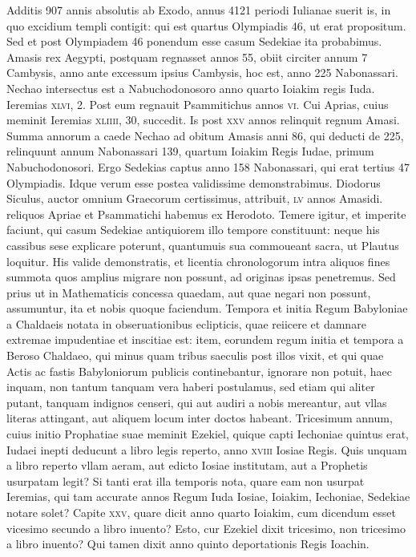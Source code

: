 Additis 907 annis absolutis ab Exodo,
annus 4121 periodi Iulianae suerit is, in quo excidium templi contigit:
qui est quartus Olympiadis 46, ut erat propositum.
Sed et post
Olympiadem 46 ponendum esse casum Sedekiae ita probabimus.
Amasis rex Aegypti, postquam regnasset annos 55, obiit circiter annum
7 Cambysis, anno ante excessum ipsius Cambysis, hoc est, anno
225 Nabonassari.
Nechao intersectus est a Nabuchodonosoro anno
quarto Ioiakim regis Iuda.
Ieremias \textsc{xlvi}, 2.
Post eum regnauit
Psammitichus annos \textsc{vi}.
Cui Aprias, cuius meminit Ieremias
\textsc{xliiii}, 30, succedit.
Is post \textsc{xxv} annos relinquit regnum Amasi.
Summa annorum a caede Nechao ad obitum Amasis anni 86, qui
deducti de 225, relinquunt annum Nabonassari 139, quartum Ioiakim
Regis Iudae, primum Nabuchodonosori.
Ergo Sedekias captus
anno 158 Nabonassari, qui erat tertius 47 Olympiadis.
Idque verum
esse postea validissime demonstrabimus.
Diodorus Siculus,
auctor omnium Graecorum certissimus, attribuit, \textsc{lv} annos Amasidi.
reliquos Apriae et Psammatichi habemus ex Herodoto.
Temere
igitur, et imperite faciunt, qui casum Sedekiae antiquiorem illo
tempore constituunt: neque his cassibus sese explicare poterunt,
quantumuis sua commoueant sacra, ut Plautus loquitur.
His valide
demonstratis, et licentia chronologorum intra aliquos fines summota
quos amplius migrare non possunt, ad originas ipsas penetremus.
Sed prius ut in Mathematicis concessa quaedam, aut quae negari
non possunt, assumuntur, ita et nobis quoque faciendum.
Tempora et initia Regum Babyloniae a Chaldaeis notata in obseruationibus
eclipticis, quae reiicere et damnare extremae impudentiae et
inscitiae est: item, eorundem regum initia et tempora a Beroso Chaldaeo,
qui minus quam tribus saeculis post illos vixit, et qui quae Actis
ac fastis Babyloniorum publicis continebantur, ignorare non potuit,
haec inquam, non tantum tanquam vera haberi postulamus, sed etiam
qui aliter putant, tanquam indignos censeri, qui aut audiri a nobis
mereantur, aut vllas literas attingant, aut aliquem locum inter
doctos habeant.
Tricesimum annum, cuius initio Prophatiae suae
meminit Ezekiel, quique capti Iechoniae quintus erat, Iudaei inepti
deducunt a libro legis reperto, anno \textsc{xviii} Iosiae Regis.
Quis unquam a libro reperto vllam aeram, aut edicto Iosiae institutam, aut a
Prophetis usurpatam legit?
Si tanti erat illa temporis nota, quare
eam non usurpat Ieremias, qui tam accurate annos Regum Iuda Iosiae,
Ioiakim, Iechoniae, Sedekiae notare solet?
Capite \textsc{xxv}, quare dicit
anno quarto Ioiakim, cum dicendum esset vicesimo secundo a libro
inuento?
Esto, cur Ezekiel dixit tricesimo, non tricesimo a libro inuento?
Qui tamen dixit anno quinto deportationis Regis Ioachin.
{}


